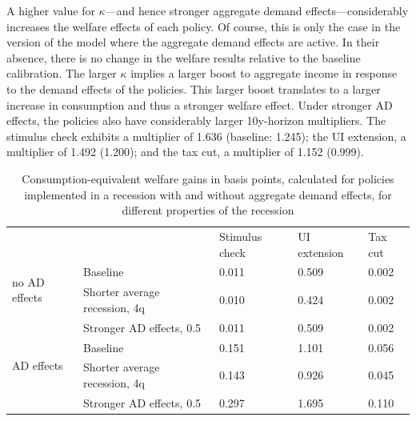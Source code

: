 \documentclass[\econtexRoot/HAFiscal]{subfiles}
\begin{document}
A higher value for $\kappa$---and hence stronger aggregate demand effects---considerably increases the welfare effects of each policy. Of course, this is only the case in the version of the model where the aggregate demand effects are active. In their absence, there is no change in the welfare results relative to the baseline calibration. The larger $\kappa$ implies a larger boost to aggregate income in response to the demand effects of the policies. This larger boost translates to a larger increase in consumption and thus a stronger welfare effect. Under stronger AD effects, the policies also have considerably larger 10y-horizon multipliers. The stimulus check exhibits a multiplier of 1.636 (baseline: 1.245); the UI extension, a multiplier of 1.492 (1.200); and the tax cut, a multiplier of 1.152 (0.999).


\begin{table}[]
  \begin{center}
    \begin{tabular}{@{}lllll@{}}
      \toprule
      &                    											& Stimulus check & UI extension & Tax cut 	\\ \cmidrule(l){1-5}
      \multirow{2}{*}{no AD effects} 					& Baseline 						& 0.011          & 0.509        & 0.002   	\\ 
      & Shorter average recession, 4q & 0.010          & 0.424        & 0.002  	\\
      & Stronger AD effects, 0.5 		& 0.011          & 0.509        & 0.002   	\\ \cmidrule(l){1-5}
      \multirow{2}{*}{AD effects}						& Baseline    					& 0.151          & 1.101        & 0.056   	\\
      & Shorter average recession, 4q & 0.143          & 0.926        & 0.045   	\\
      & Stronger AD effects, 0.5    	& 0.297          & 1.695        & 0.110   	\\ \cmidrule(l){1-5} 
    \end{tabular}
    \caption{Consumption-equivalent welfare gains in basis points, calculated for policies implemented in a recession with and without aggregate demand effects, for different properties of the recession}
    \notinsubfile{\label{tab:robustness_recession_property_results}}
  \end{center}
\end{table}
\end{document}
